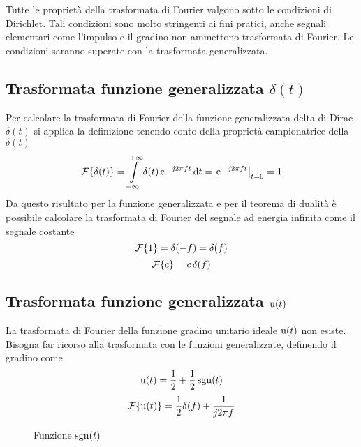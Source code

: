 \begin{nota}Tutte le proprietà della trasformata di Fourier valgono sotto le condizioni di Dirichlet. Tali condizioni sono molto stringenti ai fini pratici, anche segnali elementari come l'impulso e il gradino non ammettono trasformata di Fourier. Le condizioni saranno superate con la trasformata generalizzata.\end{nota}

\subsection{Trasformata funzione generalizzata $\delta(t)$}
Per calcolare la trasformata di Fourier della funzione generalizzata delta di Dirac $\delta(t)$ si applica la definizione tenendo conto della proprietà campionatrice della $\delta(t)$
\begin{equation}
\operatorname{\mathcal{F}}\!\left\lbrace{\delta(t)}\right\rbrace=\int\limits_{-\infty}^{+\infty}{\delta(t)\operatorname{e}^{-\operatorname{\mathit{j}\!} 2\pi f t}}{\,\mathop{}\!\mathrm{d}{t}}=\left.{\operatorname{e}^{-\operatorname{\mathit{j}\!} 2\pi f t}}\right\rvert_{t=0}=1
\end{equation}
Da questo risultato per la funzione generalizzata e per il teorema di dualità è possibile calcolare la trasformata di Fourier del segnale ad energia infinita come il segnale costante
\begin{equation}
\operatorname{\mathcal{F}}\!\left\lbrace{1}\right\rbrace=\delta(-f)=\delta(f)
\end{equation}
\[\operatorname{\mathcal{F}}\!\left\lbrace{c}\right\rbrace=c\,\delta(f)\]

\subsection{Trasformata funzione generalizzata $\operatorname{u}(t)$}
La trasformata di Fourier della funzione gradino unitario ideale $\operatorname{u}(t)$ non esiste. Bisogna far ricorso alla trasformata con le funzioni generalizzate, definendo il gradino come
\[\operatorname{u}(t)=\frac{1}{2}+\frac{1}{2}\operatorname{sgn}(t)\] 
\begin{equation}
\operatorname{\mathcal{F}}\!\left\lbrace{\operatorname{u}(t)}\right\rbrace=\frac{1}{2}\delta(f)+\frac{1}{\operatorname{\mathit{j}\!} 2\pi f}
\end{equation}
\begin{figure}[h!]\centering
{}
\caption{Funzione $\operatorname{sgn}(t)$}
\end{figure}

